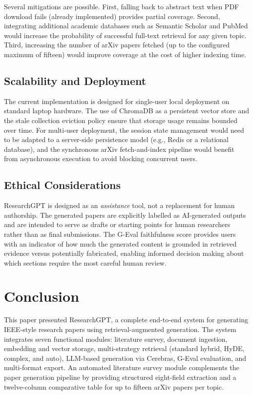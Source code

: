 \documentclass[12pt, a4paper]{article}
\begin{document}
Several mitigations are possible. First, falling back to abstract text when PDF
download fails (already implemented) provides partial coverage. Second, integrating
additional academic databases such as Semantic Scholar and PubMed would increase
the probability of successful full-text retrieval for any given topic. Third,
increasing the number of arXiv papers fetched (up to the configured maximum of
fifteen) would improve coverage at the cost of higher indexing time.

\subsection{Scalability and Deployment}

The current implementation is designed for single-user local deployment on standard
laptop hardware. The use of ChromaDB as a persistent vector store and the stale
collection eviction policy ensure that storage usage remains bounded over time.
For multi-user deployment, the session state management would need to be adapted
to a server-side persistence model (e.g., Redis or a relational database), and
the synchronous arXiv fetch-and-index pipeline would benefit from asynchronous
execution to avoid blocking concurrent users.

\subsection{Ethical Considerations}

ResearchGPT is designed as an \textit{assistance} tool, not a replacement for
human authorship. The generated papers are explicitly labelled as AI-generated
outputs and are intended to serve as drafts or starting points for human
researchers rather than as final submissions. The G-Eval faithfulness score
provides users with an indicator of how much the generated content is grounded
in retrieved evidence versus potentially fabricated, enabling informed decision
making about which sections require the most careful human review.

\section{Conclusion}

This paper presented ResearchGPT, a complete end-to-end system for generating
IEEE-style research papers using retrieval-augmented generation. The system
integrates seven functional modules: literature survey, document ingestion,
embedding and vector storage, multi-strategy retrieval (standard hybrid, HyDE,
complex, and auto), LLM-based generation via Cerebras, G-Eval evaluation,
and multi-format export. An automated literature survey module complements the
paper generation pipeline by providing structured eight-field extraction and a
twelve-column comparative table for up to fifteen arXiv papers per topic.
\end{document}

